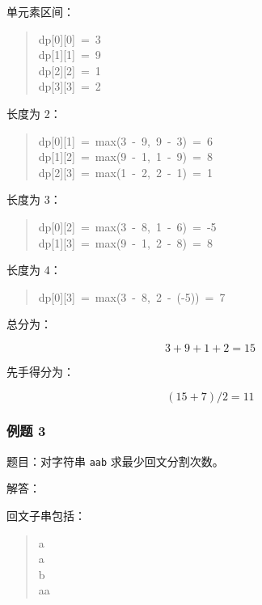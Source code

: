 \documentclass[UTF8,zihao=-4]{ctexart}
\begin{document}
单元素区间：

\begin{quote}
\small\ttfamily\raggedright
\relax dp[0][0]\ =\ 3\\
\relax dp[1][1]\ =\ 9\\
\relax dp[2][2]\ =\ 1\\
\relax dp[3][3]\ =\ 2\\
\end{quote}

长度为 2：

\begin{quote}
\small\ttfamily\raggedright
\relax dp[0][1]\ =\ max(3\ -\ 9,\ 9\ -\ 3)\ =\ 6\\
\relax dp[1][2]\ =\ max(9\ -\ 1,\ 1\ -\ 9)\ =\ 8\\
\relax dp[2][3]\ =\ max(1\ -\ 2,\ 2\ -\ 1)\ =\ 1\\
\end{quote}

长度为 3：

\begin{quote}
\small\ttfamily\raggedright
\relax dp[0][2]\ =\ max(3\ -\ 8,\ 1\ -\ 6)\ =\ -5\\
\relax dp[1][3]\ =\ max(9\ -\ 1,\ 2\ -\ 8)\ =\ 8\\
\end{quote}

长度为 4：

\begin{quote}
\small\ttfamily\raggedright
\relax dp[0][3]\ =\ max(3\ -\ 8,\ 2\ -\ (-5))\ =\ 7\\
\end{quote}

总分为：

\[3 + 9 + 1 + 2 = 15\]

先手得分为：

\[(15 + 7) / 2 = 11\]

\subsubsection*{例题 3}

题目：对字符串 \texttt{aab} 求最少回文分割次数。

解答：

回文子串包括：

\begin{quote}
\small\ttfamily\raggedright
\relax a\\
\relax a\\
\relax b\\
\relax aa\\
\end{quote}
\end{document}
